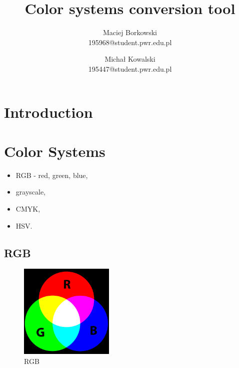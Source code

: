 \documentclass[titlepage]{article}
\title{Color systems conversion tool}
\author{Maciej Borkowski\\ 195968@student.pwr.edu.pl \and Michał Kowalski \\ 195447@student.pwr.edu.pl}
\date{}
\begin{document}
\maketitle
\section{Introduction}

\section{Color Systems}

\begin{itemize}
  \item RGB - red, green, blue,
  \item grayscale,
  \item CMYK,
  \item HSV.
\end{itemize}

\subsection{RGB}
\begin{figure}[!htb]
	\centering
	\includegraphics[width=0.4\textwidth]{img/RGB.png}
	\caption{RGB} 
	\label{fig:rgb}
\end{figure}
\end{document}
